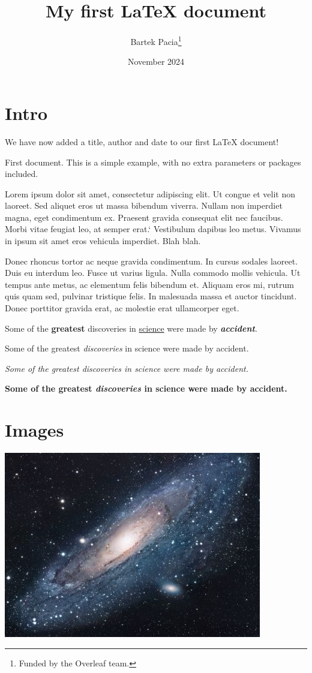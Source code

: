 \documentclass[12pt, letterpaper]{article}
\title{My first LaTeX document}
\author{Bartek Pacia\thanks{Funded by the Overleaf team.}}
\date{November 2024}
\begin{document}

    \maketitle


    \section{Intro}\label{sec:intro}

    We have now added a title, author and date to our first \LaTeX{} document!

    First document.
    This is a simple example, with no extra parameters or packages included.

    Lorem ipsum dolor sit amet, consectetur adipiscing elit.
    Ut congue et velit non laoreet.
    Sed aliquet eros ut massa bibendum viverra.
    Nullam non imperdiet magna, eget condimentum ex.
    Praesent gravida consequat elit nec faucibus.
    Morbi vitae feugiat leo, at semper erat.`
    Vestibulum dapibus leo metus.
    Vivamus in ipsum sit amet eros vehicula imperdiet.
    Blah blah.

    Donec rhoncus tortor ac neque gravida condimentum.
    In cursus sodales laoreet.
    Duis eu interdum leo.
    Fusce ut varius ligula.
    Nulla commodo mollis vehicula.
    Ut tempus ante metus, ac elementum felis bibendum et.
    Aliquam eros mi, rutrum quis quam sed, pulvinar tristique felis.
    In malesuada massa et auctor tincidunt.
    Donec porttitor gravida erat, ac molestie erat ullamcorper eget.

    Some of the \textbf{greatest} discoveries in \underline{science} were made by \textbf{\textit{accident}}.

    Some of the greatest \emph{discoveries} in science were made by accident.

    \textit{Some of the greatest \emph{discoveries} in science were made by accident.}

    \textbf{Some of the greatest \emph{discoveries} in science were made by accident.}


    \section{Images}\label{sec:images}

    \includegraphics{universe}
\end{document}
